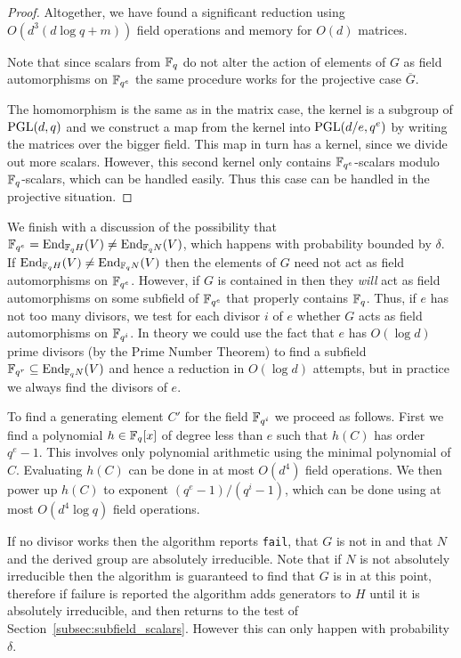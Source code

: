 \begin{proof}
Altogether, we have found a significant reduction 
using $O(d^3(d\log q +m))$ field operations and memory for $O(d)$ matrices.


Note that since scalars from $\mathbb{F}_q$ do not alter the
action of elements of $G$ as field automorphisms on $\mathbb{F}_{q^e}$ the
same procedure works for the projective case $\overline{G}$.

The homomorphism is the same as in the matrix case, the kernel 
is a subgroup of $\PGL(d,q)$ and we construct a map from the kernel into
$\PGL(d/e,q^e)$ by writing the matrices over the bigger field. This
map in turn has a kernel, since we divide out more scalars. However, this
second kernel only contains $\mathbb{F}_{q^e}$-scalars modulo
$\mathbb{F}_q$-scalars, which can be handled easily. Thus this case can
be handled in the projective situation.
\end{proof}

We finish with a discussion of the possibility that 
$\F_{q^e} = \End_{\F_q H}(V) \neq \End_{\F_q N}(V)$, which happens 
with probability bounded by $\delta$. 
If  $\End_{\F_q H}(V) \neq \End_{\F_q N}(V)$ then the elements 
of $G$ need not
act as field automorphisms on $\mathbb{F}_{q^e}$. However, if $G$ is contained in 
 then they
\emph{will} act as field automorphisms on some subfield of $\mathbb{F}_{q^e}$
that properly contains $\mathbb{F}_q$. Thus, if $e$ has not too many divisors,
we test for each divisor $i$ of $e$ whether $G$ acts as field automorphisms
on $\mathbb{F}_{q^i}$.
In theory we could use the fact that $e$ has  $O(\log d)$ prime divisors 
(by the Prime Number Theorem) to 
find a subfield $\F_{q^r} \subseteq \End_{\F_q N}(V)$ and hence a reduction
 in 
$O(\log d)$ attempts, but in practice we always find the divisors of $e$.

To find a generating element $C'$ for the field $\mathbb{F}_{q^i}$ we proceed
as follows. First we find a polynomial $h \in \mathbb{F}_q[x]$ of degree less
than $e$ such that $h(C)$ has order $q^e-1$. This involves only
polynomial arithmetic using the minimal polynomial of $C$. Evaluating
$h(C)$ can be done in at most $O(d^4)$ field operations. We then
power up $h(C)$ to exponent $(q^e-1)/(q^i-1)$, which can be done
using at most $O(d^4 \log q)$ field operations.

If no divisor works
then the algorithm reports {\tt fail}, that $G$ is not in  and 
that $N$ and the derived group are absolutely irreducible. Note that if
$N$ is not absolutely irreducible then the algorithm is guaranteed to
find that $G$ is in  at this point, therefore if failure is reported
the algorithm adds generators to $H$ until it is absolutely irreducible,
and then returns to the test of Section~\ref{subsec:subfield_scalars}.
However this can only happen with probability $\delta$.



